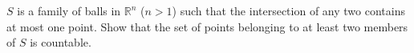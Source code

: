 $S$ is a family of balls in $\mathbb{R}^{n}$ ($n > 1$) such that the intersection of any two contains at most one point. Show that the set of points belonging to at least two members of $S$ is countable.